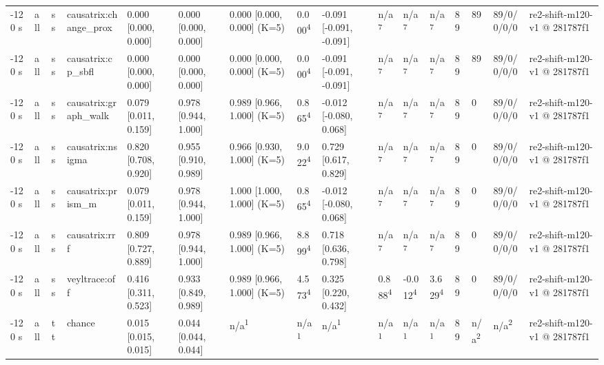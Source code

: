 \begin{table}[t]
\begin{tabular}{llllllllllllllll}
-120 s & all & ss & causatrix:change\_prox & 0.000 [0.000, 0.000] & 0.000 [0.000, 0.000] & 0.000 [0.000, 0.000] (K=5) & 0.000\textsuperscript{4} & -0.091 [-0.091, -0.091] & n/a\textsuperscript{7} & n/a\textsuperscript{7} & n/a\textsuperscript{7} & 89 & 89 & 89/0/0/0/0 & re2-shift-m120-v1 @ 281787f1 \\
-120 s & all & ss & causatrix:cp\_sbfl & 0.000 [0.000, 0.000] & 0.000 [0.000, 0.000] & 0.000 [0.000, 0.000] (K=5) & 0.000\textsuperscript{4} & -0.091 [-0.091, -0.091] & n/a\textsuperscript{7} & n/a\textsuperscript{7} & n/a\textsuperscript{7} & 89 & 89 & 89/0/0/0/0 & re2-shift-m120-v1 @ 281787f1 \\
-120 s & all & ss & causatrix:graph\_walk & 0.079 [0.011, 0.159] & 0.978 [0.944, 1.000] & 0.989 [0.966, 1.000] (K=5) & 0.865\textsuperscript{4} & -0.012 [-0.080, 0.068] & n/a\textsuperscript{7} & n/a\textsuperscript{7} & n/a\textsuperscript{7} & 89 & 0 & 89/0/0/0/0 & re2-shift-m120-v1 @ 281787f1 \\
-120 s & all & ss & causatrix:nsigma & 0.820 [0.708, 0.920] & 0.955 [0.910, 0.989] & 0.966 [0.930, 1.000] (K=5) & 9.022\textsuperscript{4} & 0.729 [0.617, 0.829] & n/a\textsuperscript{7} & n/a\textsuperscript{7} & n/a\textsuperscript{7} & 89 & 0 & 89/0/0/0/0 & re2-shift-m120-v1 @ 281787f1 \\
-120 s & all & ss & causatrix:prism\_m & 0.079 [0.011, 0.159] & 0.978 [0.944, 1.000] & 1.000 [1.000, 1.000] (K=5) & 0.865\textsuperscript{4} & -0.012 [-0.080, 0.068] & n/a\textsuperscript{7} & n/a\textsuperscript{7} & n/a\textsuperscript{7} & 89 & 0 & 89/0/0/0/0 & re2-shift-m120-v1 @ 281787f1 \\
-120 s & all & ss & causatrix:rrf & 0.809 [0.727, 0.889] & 0.978 [0.944, 1.000] & 0.989 [0.966, 1.000] (K=5) & 8.899\textsuperscript{4} & 0.718 [0.636, 0.798] & n/a\textsuperscript{7} & n/a\textsuperscript{7} & n/a\textsuperscript{7} & 89 & 0 & 89/0/0/0/0 & re2-shift-m120-v1 @ 281787f1 \\
-120 s & all & ss & veyltrace:off & 0.416 [0.311, 0.523] & 0.933 [0.849, 0.989] & 0.989 [0.966, 1.000] (K=5) & 4.573\textsuperscript{4} & 0.325 [0.220, 0.432] & 0.888\textsuperscript{4} & -0.012\textsuperscript{4} & 3.629\textsuperscript{4} & 89 & 0 & 89/0/0/0/0 & re2-shift-m120-v1 @ 281787f1 \\
-120 s & all & tt & chance & 0.015 [0.015, 0.015] & 0.044 [0.044, 0.044] & n/a\textsuperscript{1} & n/a\textsuperscript{1} & n/a\textsuperscript{1} & n/a\textsuperscript{1} & n/a\textsuperscript{1} & n/a\textsuperscript{1} & 89 & n/a\textsuperscript{2} & n/a\textsuperscript{2} & re2-shift-m120-v1 @ 281787f1 \\

\end{tabular}
\end{table}
